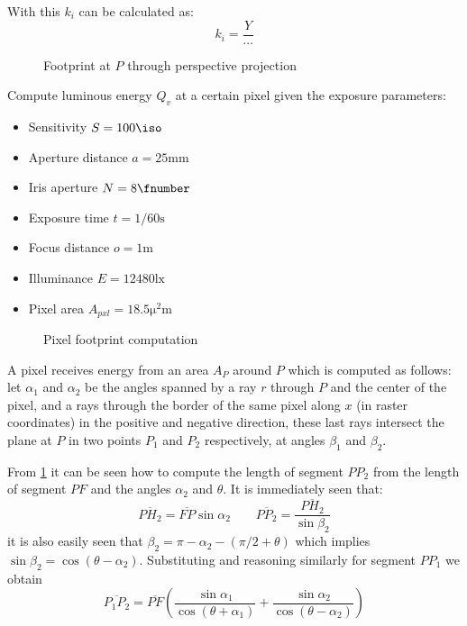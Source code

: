 With this $k_i$ can be calculated as:
\begin{displaymath}
k_i = \frac{Y}{\cdots}
\end{displaymath}

\begin{figure}

\caption{Footprint at $P$ through perspective projection}
\end{figure}

Compute luminous energy $Q_v$ at a certain pixel given the exposure parameters:

\begin{itemize}
\item Sensitivity $S = \num{100}\unit{\iso}$
\item Aperture distance $a = \num{25}\unit{\milli\meter}$
\item Iris aperture $N = \num{8}\unit{\fnumber}$
\item Exposure time $t = 1/60\unit{\second}$
\item Focus distance $o = \num{1}\unit{\meter}$
\item Illuminance $E = \num{12480}\unit{\lux}$
\item Pixel area $A_{pxl} = \num{18.5}\unit{\square\micro\meter}$
\end{itemize}

\begin{figure}

\caption{Pixel footprint computation}
\label{fig:opposite-angle}
\end{figure}

A pixel receives energy from an area $A_P$ around $P$ which is computed as follows: let $\alpha_1$ and $\alpha_2$ be the angles spanned by a ray $r$ through $P$ and the center of the pixel, and a rays through the border of the same pixel along $x$ (in raster coordinates) in the positive and negative direction, these last rays intersect  the plane at $P$ in two points $P_1$ and $P_2$ respectively, at angles $\beta_1$ and $\beta_2$.

From \cref{fig:opposite-angle} it can be seen how to compute the length of segment $PP_2$ from the length of segment $PF$ and the angles $\alpha_2$ and $\theta$. It is immediately seen that:
\begin{displaymath}
\overline{PH_2} = \overline{FP}\sin\alpha_2 \qquad \overline{PP_2} = \frac{\overline{PH_2}}{\sin\beta_2}
\end{displaymath}
it is also easily seen that $\beta_2 = \pi - \alpha_2 - (\pi/2 + \theta)$ which implies $\sin\beta_2 = \cos(\theta-\alpha_2)$. Substituting and reasoning similarly for segment $PP_1$ we obtain
\begin{displaymath}
\overline{P_1P_2} = \overline{PF}
	\left(\frac{\sin\alpha_1}{\cos(\theta+\alpha_1)} +
	      \frac{\sin\alpha_2}{\cos(\theta-\alpha_2)}\right)
\end{displaymath}

